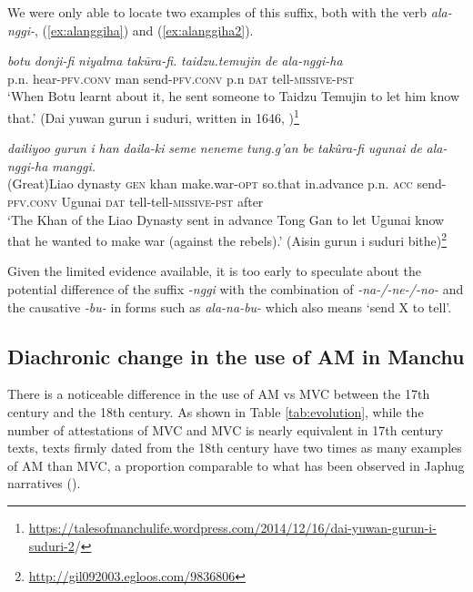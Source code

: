 \documentclass{article}
\newcommand{\ipa}[1]{\textit{{\phon\mbox{#1}}}} %
\begin{document}
We were only able to locate two examples of this suffix, both with the verb \ipa{ala-nggi-}, (\ref{ex:alanggiha}) and (\ref{ex:alanggiha2}).

\begin{exe}
\ex \label{ex:alanggiha}
\gll \ipa{botu} 	\ipa{donji-fi} 	\ipa{niyalma} 	\ipa{takūra-fi.} 	\ipa{taidzu.temujin} 	\ipa{de} 	\ipa{ala-nggi-ha} \\
p.n. hear-\textsc{pfv.conv} man send-\textsc{pfv.conv} p.n \textsc{dat} tell-\textsc{missive-pst} \\
\glt `When Botu learnt about it, he sent someone to Taidzu Temujin to let him know that.' (Dai yuwan gurun i suduri, written in 1646, \citealt[121-192]{klaproth1828chrestomathie})\footnote{
 \url{https://talesofmanchulife.wordpress.com/2014/12/16/dai-yuwan-gurun-i-suduri-2}/
}
\end{exe}


\begin{exe}
\ex \label{ex:alanggiha2}
\gll 
\ipa{dailiyoo} 	\ipa{gurun} 	\ipa{i} 	\ipa{han} 	\ipa{daila-ki} 	\ipa{seme} 	\ipa{neneme} 	\ipa{tung.g’an} 	\ipa{be} 	\ipa{takûra-fi} 	\ipa{ugunai} 	\ipa{de} 	\ipa{ala-nggi-ha} 	\ipa{manggi.} \\
(Great)Liao dynasty \textsc{gen} khan make.war-\textsc{opt} so.that in.advance p.n. \textsc{acc} send-\textsc{pfv.conv} Ugunai \textsc{dat} tell-tell-\textsc{missive-pst} after \\
\glt `The Khan of the Liao Dynasty sent in advance Tong Gan to let Ugunai know that he wanted to make war (against the rebels).' (Aisin gurun i suduri bithe)\footnote{\url{http://gil092003.egloos.com/9836806}}
\end{exe}

Given the limited evidence available, it is too early to speculate about the potential difference of the suffix \ipa{-nggi} with the combination of \ipa{-na-/-ne-/-no-} and the causative \ipa{-bu-} in forms such as \ipa{ala-na-bu-} which also means `send X to tell'.
 
\subsection{Diachronic change in the use of AM in Manchu} \label{sec:diachrony}
There is a noticeable difference in the use of AM vs MVC between the 17th century and the 18th century. As shown in Table \ref{tab:evolution}, while the number of attestations of MVC and MVC is nearly equivalent in 17th century texts, texts firmly dated from the 18th century have two times as many examples of AM than MVC, a proportion comparable to what has been observed in Japhug narratives (\citealt[209]{jacques13harmonization}).
\end{document}
